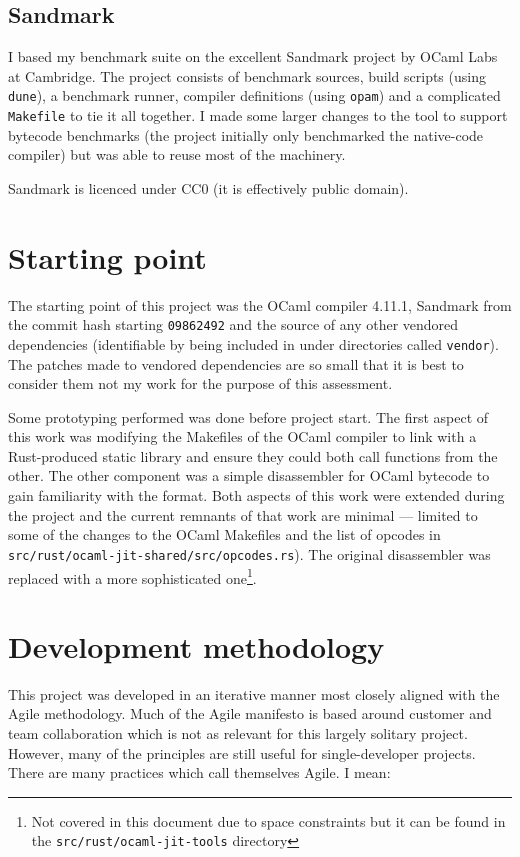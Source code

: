 \subsection{Sandmark}

I based my benchmark suite on the excellent Sandmark project by OCaml Labs at Cambridge. The
project consists of benchmark sources, build scripts (using \texttt{dune}), a benchmark runner,
compiler definitions (using \texttt{opam}) and a complicated \texttt{Makefile} to tie it all
together.  I made some larger changes to the tool to support bytecode benchmarks (the project
initially only benchmarked the native-code compiler) but was able to reuse most of the machinery.

Sandmark is licenced under CC0 (it is effectively public domain).

\section{Starting point}

The starting point of this project was the OCaml compiler 4.11.1, Sandmark from the commit hash
starting \texttt{09862492} and the source of any other vendored dependencies (identifiable by being
included in under directories called \texttt{vendor}). The patches made to vendored dependencies
are
so small that it is best to consider them not my work for the purpose of this assessment.

Some prototyping performed was done before project start.  The first aspect of this work was
modifying
the Makefiles of the OCaml compiler to link with a
Rust-produced static library and ensure they could both call functions from the other. The other
component was a simple disassembler for OCaml bytecode to gain familiarity with the format. Both
aspects of this work were extended during the project and the current remnants of that work are
minimal --- limited to some of the changes to the OCaml Makefiles and the list of opcodes in
\texttt{src/rust/ocaml-jit-shared/src/opcodes.rs}).  The original disassembler was replaced with a
more sophisticated one\footnote{Not covered in this document due to space constraints but it
    can be found in the \texttt{src/rust/ocaml-jit-tools} directory}.

\section{Development methodology} \label{dev-methodology}

This project was developed in an iterative manner most closely aligned with the Agile
methodology. Much of the Agile manifesto is based around customer and team collaboration which is
not as relevant for this largely solitary project. However, many of the principles are still useful
for single-developer projects. There are many practices which call themselves Agile. I mean:

